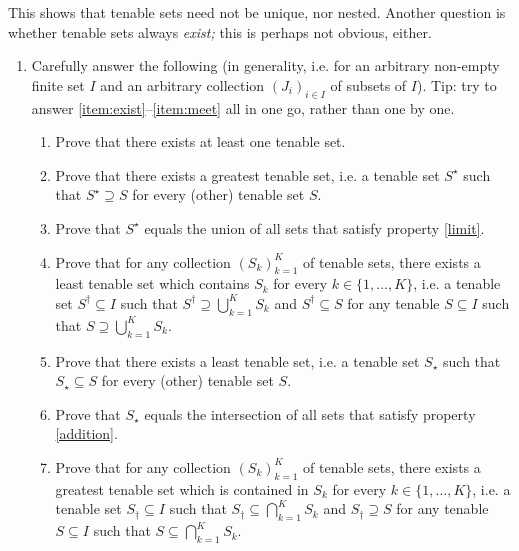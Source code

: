 \begin{exercise}
\begin{enumerate}[label=(\alph*)]
	\end{enumerate}

	This shows that tenable sets need not be unique, nor nested. Another question is whether tenable sets always \emph{exist;} this is perhaps not obvious, either.

	\begin{enumerate}[label=(\alph*),resume]

		\item Carefully answer the following (in generality, i.e. for an arbitrary non-empty finite set $I$ and an arbitrary collection $(J_i)_{i \in I}$ of subsets of $I$). Tip: try to answer \ref{item:exist}--\ref{item:meet} all in one go, rather than one by one.

		\begin{enumerate}[label=(\roman*)]
		
			\item \label{item:exist} Prove that there exists at least one tenable set.

			\item \label{item:greatest} Prove that there exists a greatest tenable set, i.e. a tenable set $S^\star$ such that $S^\star \supseteq S$ for every (other) tenable set $S$.

			\item \label{item:union} Prove that $S^\star$ equals the union of all sets that satisfy property \ref{limit}.

			\item \label{item:join} Prove that for any collection $(S_k)_{k=1}^K$ of tenable sets, there exists a least tenable set which contains $S_k$ for every $k \in \{1,\dots,K\}$, i.e. a tenable set $S^\dag \subseteq I$ such that $S^\dag \supseteq \bigcup_{k=1}^K S_k$ and $S^\dag \subseteq S$ for any tenable $S \subseteq I$ such that $S \supseteq \bigcup_{k=1}^K S_k$.

			\item \label{item:least} Prove that there exists a least tenable set, i.e. a tenable set $S_\star$ such that $S_\star \subseteq S$ for every (other) tenable set $S$.

			\item \label{item:intersect} Prove that $S_\star$ equals the intersection of all sets that satisfy property \ref{addition}.

			\item \label{item:meet} Prove that for any collection $(S_k)_{k=1}^K$ of tenable sets, there exists a greatest tenable set which is contained in $S_k$ for every $k \in \{1,\dots,K\}$, i.e. a tenable set $S_\dag \subseteq I$ such that $S_\dag \subseteq \bigcap_{k=1}^K S_k$ and $S_\dag \supseteq S$ for any tenable $S \subseteq I$ such that $S \subseteq \bigcap_{k=1}^K S_k$.


\end{enumerate}
\end{enumerate}
\end{exercise}
